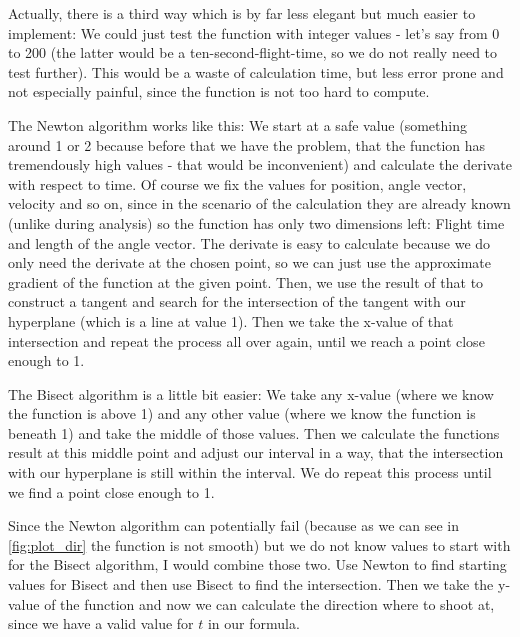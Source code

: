 Actually, there is a third way which is by far less elegant but much easier to implement: We could just test the function with integer values - let's say from 0 to 200 (the latter would be a ten-second-flight-time, so we do not really need to test further). This would be a waste of calculation time, but less error prone and not especially painful, since the function is not too hard to compute.

The Newton algorithm works like this: We start at a safe value (something around 1 or 2 because before that we have the problem, that the function has tremendously high values - that would be inconvenient) and calculate the derivate with respect to time. Of course we fix the values for position, angle vector, velocity and so on, since in the scenario of the calculation they are already known (unlike during analysis) so the function has only two dimensions left: Flight time and length of the angle vector. The derivate is easy to calculate because we do only need the derivate at the chosen point, so we can just use the approximate gradient of the function at the given point. Then, we use the result of that to construct a tangent and search for the intersection of the tangent with our hyperplane (which is a line at value 1). Then we take the x-value of that intersection and repeat the process all over again, until we reach a point close enough to 1.

The Bisect algorithm is a little bit easier: We take any x-value (where we know the function is above 1) and any other value (where we know the function is beneath 1) and take the middle of those values. Then we calculate the functions result at this middle point and adjust our interval in a way, that the intersection with our hyperplane is still within the interval. We do repeat this process until we find a point close enough to 1. 

Since the Newton algorithm can potentially fail (because as we can see in \figurename{} \ref{fig:plot_dir} the function is not smooth) but we do not know values to start with for the Bisect algorithm, I would combine those two. Use Newton to find starting values for Bisect and then use Bisect to find the intersection. Then we take the y-value of the function and now we can calculate the direction where to shoot at, since we have a valid value for $t$ in our formula.